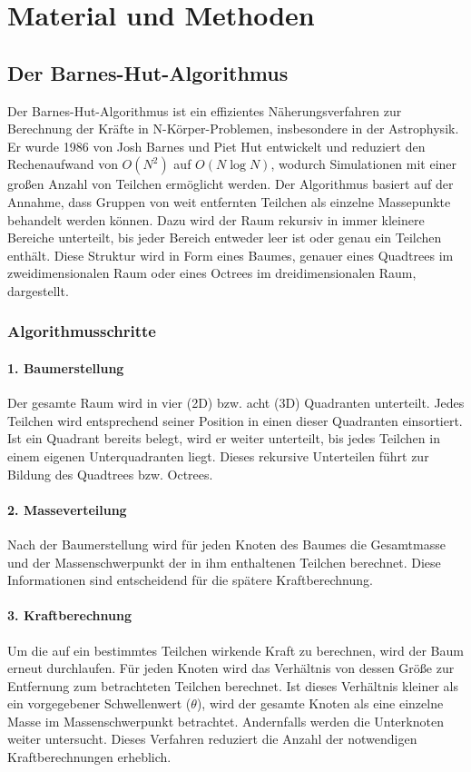 \documentclass[a4paper,12pt,twoside]{article}
\begin{document}
\section{Material und Methoden}

\subsection{Der Barnes-Hut-Algorithmus}
Der Barnes-Hut-Algorithmus ist ein effizientes Näherungsverfahren zur Berechnung der Kräfte in N-Körper-Problemen, insbesondere in der Astrophysik. Er wurde 1986 von Josh Barnes und Piet Hut entwickelt und reduziert den Rechenaufwand von $O(N^2)$ auf $O(N \log N)$, wodurch Simulationen mit einer großen Anzahl von Teilchen ermöglicht werden.
Der Algorithmus basiert auf der Annahme, dass Gruppen von weit entfernten Teilchen als einzelne Massepunkte behandelt werden können. Dazu wird der Raum rekursiv in immer kleinere Bereiche unterteilt, bis jeder Bereich entweder leer ist oder genau ein Teilchen enthält. Diese Struktur wird in Form eines Baumes, genauer eines Quadtrees im zweidimensionalen Raum oder eines Octrees im dreidimensionalen Raum, dargestellt.

\subsubsection{Algorithmusschritte}

\paragraph{1. Baumerstellung}
Der gesamte Raum wird in vier (2D) bzw. acht (3D) Quadranten unterteilt. Jedes Teilchen wird entsprechend seiner Position in einen dieser Quadranten einsortiert. Ist ein Quadrant bereits belegt, wird er weiter unterteilt, bis jedes Teilchen in einem eigenen Unterquadranten liegt. Dieses rekursive Unterteilen führt zur Bildung des Quadtrees bzw. Octrees.

\paragraph{2. Masseverteilung}
Nach der Baumerstellung wird für jeden Knoten des Baumes die Gesamtmasse und der Massenschwerpunkt der in ihm enthaltenen Teilchen berechnet. Diese Informationen sind entscheidend für die spätere Kraftberechnung.

\paragraph{3. Kraftberechnung}
Um die auf ein bestimmtes Teilchen wirkende Kraft zu berechnen, wird der Baum erneut durchlaufen. Für jeden Knoten wird das Verhältnis von dessen Größe zur Entfernung zum betrachteten Teilchen berechnet. Ist dieses Verhältnis kleiner als ein vorgegebener Schwellenwert ($\theta$), wird der gesamte Knoten als eine einzelne Masse im Massenschwerpunkt betrachtet. Andernfalls werden die Unterknoten weiter untersucht. Dieses Verfahren reduziert die Anzahl der notwendigen Kraftberechnungen erheblich.
\end{document}

